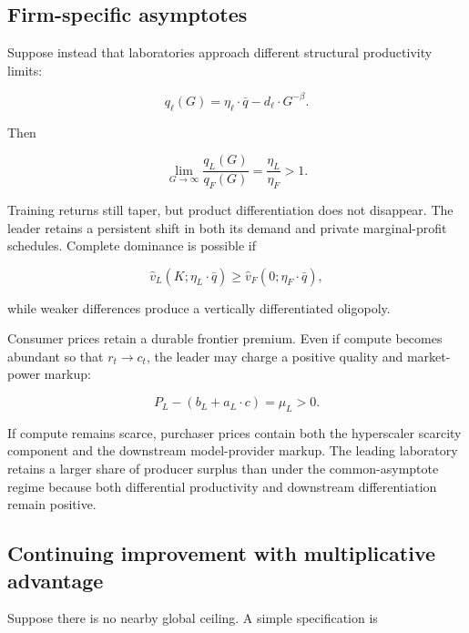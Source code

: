 \documentclass[11pt]{article}
\begin{document}
\subsection{Firm-specific asymptotes}
\label{subsec:firm-specific-asymptotes}

Suppose instead that laboratories approach different structural productivity limits:

\begin{equation}q_\ell(G)=\eta_\ell\cdot\bar q-d_\ell\cdot G^{-\beta}.\end{equation}

Then

\begin{equation}\lim_{G\rightarrow\infty}\frac{q_L(G)}{q_F(G)}=\frac{\eta_L}{\eta_F}>1.\end{equation}

Training returns still taper, but product differentiation does not disappear. The leader retains a persistent shift in both its demand and private marginal-profit schedules. Complete dominance is possible if

\begin{equation}\widehat v_L(K;\eta_L\cdot\bar q)\geq\widehat v_F(0;\eta_F\cdot\bar q),\end{equation}

while weaker differences produce a vertically differentiated oligopoly.

Consumer prices retain a durable frontier premium. Even if compute becomes abundant so that $r_t\rightarrow c_t$, the leader may charge a positive quality and market-power markup:

\begin{equation}P_L-\left(b_L+a_L\cdot c\right)=\mu_L>0.\end{equation}

If compute remains scarce, purchaser prices contain both the hyperscaler scarcity component and the downstream model-provider markup. The leading laboratory retains a larger share of producer surplus than under the common-asymptote regime because both differential productivity and downstream differentiation remain positive.

\subsection{Continuing improvement with multiplicative advantage}
\label{subsec:continuing-improvement}

Suppose there is no nearby global ceiling. A simple specification is
\end{document}
